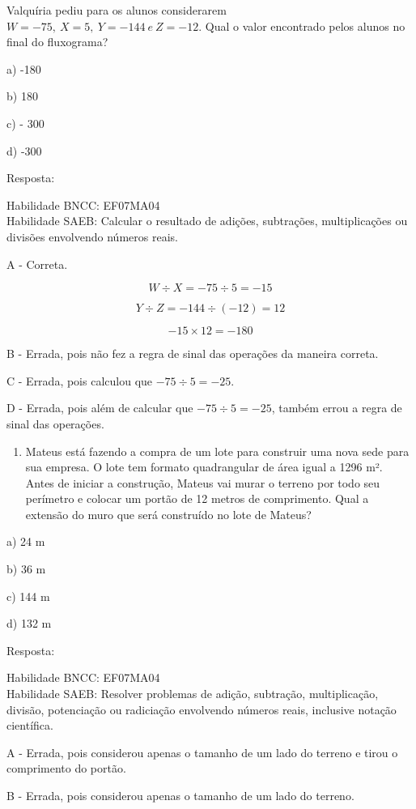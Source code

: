 Valquíria pediu para os alunos considerarem
\(W = - 75,\ X = 5,\ Y = - 144\ e\ Z = - 12\). Qual o valor encontrado
pelos alunos no final do fluxograma?

a) -180

b) 180

c) - 300

d) -300

Resposta:

Habilidade BNCC: EF07MA04\\
Habilidade SAEB: Calcular o resultado de adições, subtrações,
multiplicações ou divisões envolvendo números reais.

A - Correta.

\[W \div X = - 75 \div 5 = - 15\]

\[Y \div Z = - 144 \div ( - 12) = 12\]

\[- 15 \times 12 = - 180\]

B - Errada, pois não fez a regra de sinal das operações da maneira
correta.

C - Errada, pois calculou que \(- 75 \div 5 = - 25\).

D - Errada, pois além de calcular que \(- 75 \div 5 = - 25\), também
errou a regra de sinal das operações.

\begin{enumerate}
\def\labelenumi{\arabic{enumi})}
\setcounter{enumi}{2}
\tightlist
\item
  Mateus está fazendo a compra de um lote para construir uma nova sede
  para sua empresa. O lote tem formato quadrangular de área igual a 1296
  m². Antes de iniciar a construção, Mateus vai murar o terreno por todo
  seu perímetro e colocar um portão de 12 metros de comprimento. Qual a
  extensão do muro que será construído no lote de Mateus?
\end{enumerate}

a) 24 m

b) 36 m

c) 144 m

d) 132 m

Resposta:

Habilidade BNCC: EF07MA04\\
Habilidade SAEB: Resolver problemas de adição, subtração, multiplicação,
divisão, potenciação ou radiciação envolvendo números reais, inclusive
notação científica.

A - Errada, pois considerou apenas o tamanho de um lado do terreno e
tirou o comprimento do portão.

B - Errada, pois considerou apenas o tamanho de um lado do terreno.


